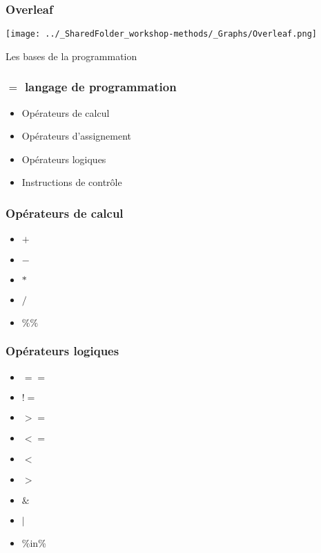 \documentclass{beamer}
\begin{document}
    \begin{frame}
        \frametitle{Overleaf}
        \begin{center}
           \texttt{[image: ../\_SharedFolder\_workshop-methods/\_Graphs/Overleaf.png]}
        \end{center}  
    \end{frame}

    \begin{frame}
     \begin{center}
          \Huge \R {} Les bases de la programmation
      \end{center}
    \end{frame}


    \begin{frame}
        \frametitle{\R $=$ langage de programmation}
        \begin{itemize}
            \item Opérateurs de calcul
            \item Opérateurs d'assignement
            \item Opérateurs logiques
            \item Instructions de contrôle
        \end{itemize}
    \end{frame}

    \begin{frame}
        \frametitle{Opérateurs de calcul}
        \begin{itemize}
            \item $+$
            \item $-$
            \item $*$
            \item $/$
            \item $\%\%$ 
        \end{itemize}
    \end{frame}
    
    \begin{frame}
        \frametitle{Opérateurs logiques}
        \begin{itemize}
            \item $==$
            \item $!=$
            \item $>=$
            \item $<=$
            \item $<$
            \item $>$
            \item $\&$
            \item $|$
            \item \%in\%
        \end{itemize}
    \end{frame}
    
\end{document}
